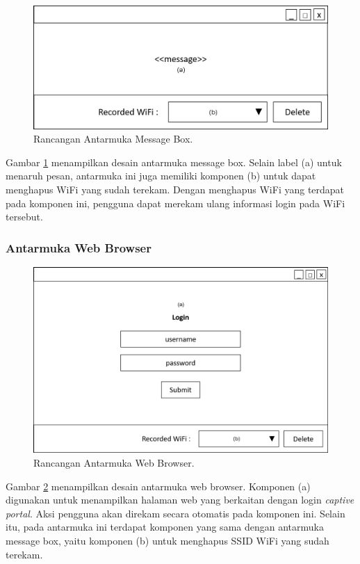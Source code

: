 \begin{figure}[!htb]
    \centering
    \includegraphics[scale=0.5]{Gambar/UI_MessageBox.png}
    \caption[Rancangan Antarmuka Message Box.]{Rancangan Antarmuka Message Box.}
    \label{fig:RancanganAntarmukaMessageBox}
\end{figure}

Gambar \ref{fig:RancanganAntarmukaMessageBox} menampilkan desain antarmuka message box. Selain label (a) untuk menaruh pesan, antarmuka ini juga memiliki komponen (b) untuk dapat menghapus WiFi yang sudah terekam. Dengan menghapus WiFi yang terdapat pada komponen ini, pengguna dapat merekam ulang informasi login pada WiFi tersebut.

\subsubsection{Antarmuka Web Browser}
\label{subsec:antarmuka_web_browser}

\begin{figure}[!htb]
    \centering
    \includegraphics[scale=0.5]{Gambar/UI_WebBrowser.png}
    \caption[Rancangan Antarmuka Web Browser.]{Rancangan Antarmuka Web Browser.}
    \label{fig:RancanganAntarmukaWebBrowser}
\end{figure}

Gambar \ref{fig:RancanganAntarmukaWebBrowser} menampilkan desain antarmuka web browser. Komponen (a) digunakan untuk menampilkan halaman web yang berkaitan dengan login \textit{captive portal}. Aksi pengguna akan direkam secara otomatis pada komponen ini. Selain itu, pada antarmuka ini terdapat komponen yang sama dengan antarmuka message box, yaitu komponen (b) untuk menghapus SSID WiFi yang sudah terekam.